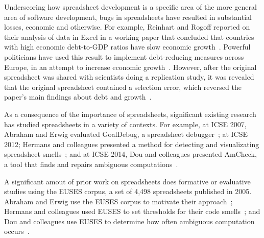 \documentclass[conference]{IEEEtran}
\begin{document}
Underscoring how spreadsheet development is a specific area of the more general
area of software development,
bugs in spreadsheets have resulted in substantial losses, economic and otherwise.
For example, Reinhart and Rogoff reported on their analysis of data in Excel in 
a working paper that concluded that countries with high economic debt-to-GDP
ratios have slow economic growth~\cite{reinhart2010growth}.
Powerful politicians have used this result to implement debt-reducing measures
across Europe, in an attempt to increase economic growth~\cite{cassidy}.
However, after the original spreadsheet was shared with scientists doing a replication
study, it was revealed that the original spreadsheet contained a selection error,
which reversed the paper's main findings about debt and growth~\cite{coy}.

As a consequence of the importance of spreadsheets, significant existing research
has studied spreadsheets in a variety of contexts.
For example, at ICSE 2007, Abraham and Erwig evaluated GoalDebug, a spreadsheet
debugger~\cite{abraham2007goaldebug}; at ICSE 2012; Hermans and colleagues presented a method for
detecting and visualizating spreadsheet smells~\cite{hermans2012detecting}; and 
at ICSE 2014, Dou and colleagues presented AmCheck,
a tool that finds and repairs ambiguous computations~\cite{dou2014spreadsheet}.

A significant amout of prior work on spreadsheets does formative or evaluative 
studies using the EUSES corpus, a set of 4,498 spreadsheets published in 2005.
Abraham and Erwig use the EUSES corpus to motivate their approach~\cite{abraham2007goaldebug};
Hermans and colleagues used EUSES to set thresholds 
for their code smells~\cite{hermans2012detecting}; and Dou and colleagues
use EUSES to determine how often ambiguous computation occurs~\cite{dou2014spreadsheet}.

\end{document}
